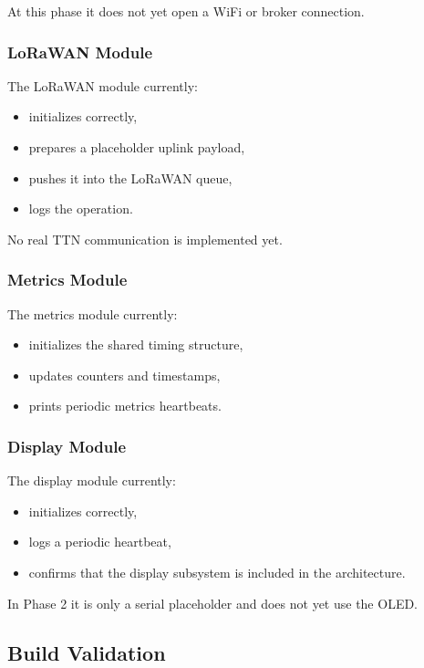 \documentclass[12pt,a4paper]{article}
\begin{document}
At this phase it does not yet open a WiFi or broker connection.

\subsubsection{LoRaWAN Module}

The LoRaWAN module currently:

\begin{itemize}
    \item initializes correctly,
    \item prepares a placeholder uplink payload,
    \item pushes it into the LoRaWAN queue,
    \item logs the operation.
\end{itemize}

No real TTN communication is implemented yet.

\subsubsection{Metrics Module}

The metrics module currently:

\begin{itemize}
    \item initializes the shared timing structure,
    \item updates counters and timestamps,
    \item prints periodic metrics heartbeats.
\end{itemize}

\subsubsection{Display Module}

The display module currently:

\begin{itemize}
    \item initializes correctly,
    \item logs a periodic heartbeat,
    \item confirms that the display subsystem is included in the architecture.
\end{itemize}

In Phase 2 it is only a serial placeholder and does not yet use the OLED.

\subsection{Build Validation}
\end{document}
